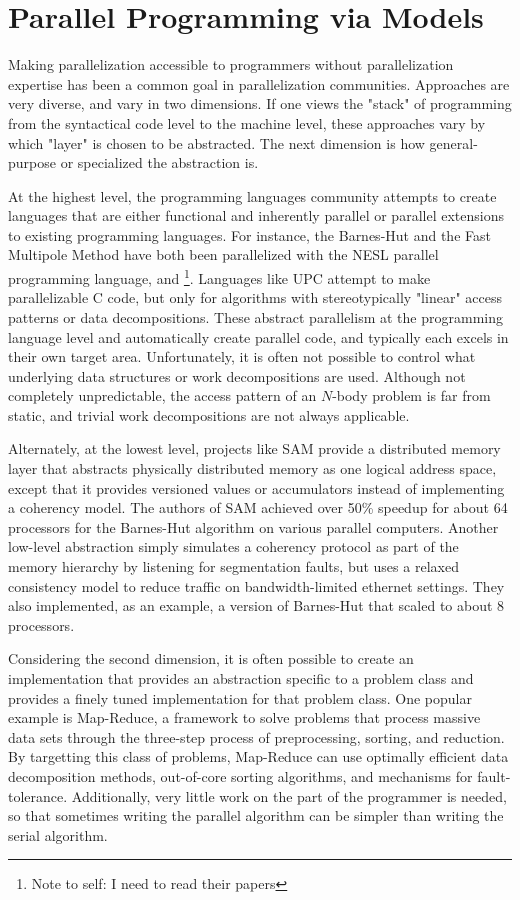 \documentclass[times, leqno,twocolumn]{article}
\newcommand{\authornote}[1]{\footnote{Note to self: #1}}
\newcommand{\authorsnote}[1]{\authornote{#1}}
\begin{document}
\section{Parallel Programming via Models}

Making parallelization accessible to programmers without parallelization expertise has been a common goal in parallelization communities.
Approaches are very diverse, and vary in two dimensions.
If one views the "stack" of programming from the syntactical code level to the machine level, these approaches vary by which "layer" is chosen to be abstracted.
The next dimension is how general-purpose or specialized the abstraction is.

At the highest level, the programming languages community attempts to create languages that are either functional and inherently parallel or parallel extensions to existing programming languages.
For instance, the Barnes-Hut and the Fast Multipole Method have both been parallelized with the NESL parallel programming language, and \cite{hu-implementing, more}\authorsnote{I need to read their papers}.
Languages like UPC attempt to make parallelizable C code, but only for algorithms with stereotypically "linear" access patterns or data decompositions.
These abstract parallelism at the programming language level and automatically create parallel code, and typically each excels in their own target area.
Unfortunately, it is often not possible to control what underlying data structures or work decompositions are used.
Although not completely unpredictable, the access pattern of an $N$-body problem is far from static, and trivial work decompositions are not always applicable.

Alternately, at the lowest level, projects like SAM\cite{sam} provide a distributed memory layer that abstracts physically distributed memory as one logical address space, except that it provides versioned values or accumulators instead of implementing a coherency model.
The authors of SAM achieved over 50\% speedup for about 64 processors for the Barnes-Hut algorithm on various parallel computers.
Another low-level abstraction simply simulates a coherency protocol as part of the memory hierarchy by listening for segmentation faults, but uses a relaxed consistency model to reduce traffic on bandwidth-limited ethernet settings.
They also implemented, as an example, a version of Barnes-Hut that scaled to about 8 processors\cite{relaxed}.

Considering the second dimension, it is often possible to create an implementation that provides an abstraction specific to a problem class and provides a finely tuned implementation for that problem class.
One popular example is Map-Reduce, a framework to solve problems that process massive data sets through the three-step process of preprocessing, sorting, and reduction.
By targetting this class of problems, Map-Reduce can use optimally efficient data decomposition methods, out-of-core sorting algorithms, and mechanisms for fault-tolerance.
Additionally, very little work on the part of the programmer is needed, so that sometimes writing the parallel algorithm can be simpler than writing the serial algorithm.
\end{document}
